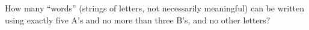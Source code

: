 How many ``words'' (strings of letters, not necessarily meaningful) can be written using exactly five A's and no more than three B's, and no other letters?
